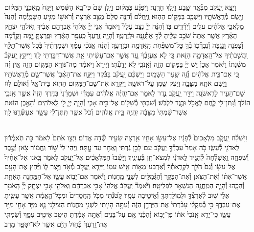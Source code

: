 \documentclass[twoside, openany, parskip=half, 11pt]{book}
\begin{document}
\begin{footnotesize}
\begin{multicols}{2}
\\
וַיֵּצֵ֥א יַֽעֲקֹ֖ב מִבְּ֯אֵ֣ר שָׁ֑בַע וַיֵּ֖לֶךְ חָרָֽנָה׃ וַיִּפְגַּ֨ע בַּמָּק֜וֹם וַיָּ֤לֶן שָׁם֙ כִּי־בָ֣א הַשֶּׁ֔מֶשׁ וַיִּקַּח֙ מֵֽאַבְנֵ֣י הַמָּק֔וֹם וַיָּ֖שֶׂם מְ֯רַֽאֲשֹׁתָ֑יו וַיִּשְׁכַּ֖ב בַּמָּק֥וֹם הַהֽוּא׃ וַֽיַּֽחֲלֹ֗ם וְ֯הִנֵּ֤ה סֻלָּם֙ מֻצָּ֣ב אַ֔רְצָה וְ֯רֹאשׁ֖וֹ מַגִּ֣יעַ הַשָּׁמָ֑יְ֯מָה וְ֯הִנֵּה֙ מַלְאֲכֵ֣י אֱלֹהִ֔ים עֹלִ֥ים וְ֯יֹֽרְ֯דִ֖ים בּֽוֹ׃  וְ֯הִנֵּ֨ה יְיָ֜ נִצָּ֣ב עָלָיו֘ וַיֹּאמַר֒ אֲנִ֣י יְיָ֗ אֱלֹהֵי֙ אַבְרָהָ֣ם אָבִ֔יךָ וֵֽאלֹהֵ֖י יִצְחָ֑ק הָאָ֗רֶץ אֲשֶׁ֤ר אַתָּה֙ שֹׁכֵ֣ב עָלֶ֔יהָ לְ֯ךָ֥ אֶתְּ֯נֶ֖נָּה וּלְזַרְעֶֽךָ׃ וְ֯הָיָ֤ה זַֽרְעֲךָ֙ כַּֽעֲפַ֣ר הָאָ֔רֶץ וּפָֽרַצְתָּ֛ יׇׇׇׇׇׇ֥מָּה וָקֵ֖דְ֯מָה וְ֯צָפֹ֣נָה וָנֶ֑גְבָּה וְ֯נִבְרְ֯כ֥וּ בְ֯ךָ֛ כׇּל־מִשְׁפְּ֯חֹ֥ת הָֽאֲדָמָ֖ה וּבְזַרְעֶֽךָ׃ וְ֯הִנֵּ֨ה אָֽנֹכִ֜י עִמָּ֗ךְ וּשְׁמַרְתִּ֨יךָ֙ בְּ֯כֹ֣ל אֲשֶׁר־תֵּלֵ֔ךְ וַֽהֲשִׁ֣בֹתִ֔יךָ אֶל־הָֽאֲדָמָ֖ה הַזֹּ֑את כִּ֚י לֹ֣א אֶֽעֱזָבְ֯ךָ֔ עַ֚ד אֲשֶׁ֣ר אִם־עָשִׂ֔יתִי אֵ֥ת אֲשֶׁר־דִּבַּ֖רְתִּי לָֽךְ׃ וַיִּיקַ֣ץ יַֽעֲקֹב֘ מִשְּׁ֯נָתוֹ֒ וַיֹּ֗אמֶר אָכֵן֙ יֵ֣שׁ יְיָ֔ בַּמָּק֖וֹם הַזֶּ֑ה וְ֯אָֽנֹכִ֖י לֹ֥א יָדָֽעְ֯תִּי׃ וַיִּירָא֙ וַיֹּאמַ֔ר מַה־נּוֹרָ֖א הַמָּק֣וֹם הַזֶּ֑ה אֵ֣ין זֶ֗ה כִּ֚י אִם־בֵּ֣ית אֱלֹהִ֔ים וְ֯זֶ֖ה שַׁ֥עַר הַשָּׁמָֽיִם׃  וַיַּשְׁכֵּ֨ם יַֽעֲקֹ֜ב בַּבֹּ֗קֶר וַיִּקַּ֤ח אֶת־הָאֶ֨בֶן֙ אֲשֶׁר־שָׂ֣ם מְ֯רַֽאֲשֹׁתָ֔יו וַיָּ֥שֶׂם אֹתָ֖הּ מַצֵּבָ֑ה וַיִּצֹ֥ק שֶׁ֖מֶן עַל־רֹאשָֽׁהּ׃ וַיִּקְרָ֛א אֶת־שֵׁם־הַמָּק֥וֹם הַה֖וּא בֵּית־אֵ֑ל וְ֯אוּלָ֛ם ל֥וּז שֵׁם־הָעִ֖יר לָרִֽאשֹׁנָֽה׃ וַיִּדַּ֥ר יַֽעֲקֹ֖ב נֶ֣דֶר לֵאמֹ֑ר אִם־יִֽהְיֶ֨ה אֱלֹהִ֜ים עִמָּדִ֗י וּשְׁמָרַ֨נִי֙ בַּדֶּ֤רֶךְ הַזֶּה֙ אֲשֶׁ֣ר אָֽנֹכִ֣י הוֹלֵ֔ךְ וְ֯נָֽתַן־לִ֥י לֶ֛חֶם לֶֽאֱכֹ֖ל וּבֶ֥גֶד לִלְבֹּֽשׁ׃ וְ֯שַׁבְתִּ֥י בְ֯שָׁל֖וֹם אֶל־בֵּ֣ית אָבִ֑י וְ֯הָיָ֧ה יְיָ֛ לִ֖י לֵֽאלֹהִֽים׃ וְ֯הָאֶ֣בֶן הַזֹּ֗את אֲשֶׁר־שַׂ֨מְתִּי֙ מַצֵּבָ֔ה יִֽהְיֶ֖ה בֵּ֣ית אֱלֹהִ֑ים וְ֯כֹל֙ אֲשֶׁ֣ר תִּֽתֶּן־לִ֔י עַשֵּׂ֖ר אֲעַשְּׂ֯רֶ֥נּוּ לָֽךְ׃

\\
וַיִּשְׁלַ֨ח יַֽעֲקֹ֤ב מַלְאָכִים֙ לְ֯פָנָ֔יו אֶל־עֵשָׂ֖ו אָחִ֑יו אַ֥רְצָה שֵׂעִ֖יר שְׂ֯דֵ֥ה אֱדֽוֹם׃ וַיְצַ֤ו אֹתָם֙ לֵאמֹ֔ר כֹּ֣ה תֹֽאמְ֯ר֔וּן לַֽאדֹנִ֖י לְ֯עֵשָׂ֑ו כֹּ֤ה אָמַר֙ עַבְדְּ֯ךָ֣ יַֽעֲקֹ֔ב עִם־לָבָ֣ן גַּ֔רְתִּי וָֽאֵחַ֖ר עַד־עׇׇׇׇׇׇׇׇֽתָּה׃ וַֽיְהִי־לִי֙ שׁ֣וֹר וַֽחֲמ֔וֹר צֹ֖אן וְ֯עֶ֣בֶד וְ֯שִׁפְחָ֑ה וָֽאֶשְׁלְ֯חָה֙ לְ֯הַגִּ֣יד לַֽאדֹנִ֔י לִמְצֹא־חֵ֖ן בְּ֯עֵינֶֽיךָ׃  וַיָּשֻׁ֨בוּ֙ הַמַּלְאָכִ֔ים אֶל־יַֽעֲקֹ֖ב לֵאמֹ֑ר בָּ֤אנוּ אֶל־אָחִ֨יךָ֙ אֶל־עֵשָׂ֔ו וְ֯גַם֙ הֹלֵ֣ךְ לִקְרָֽאתְ֯ךָ֔ וְ֯אַרְבַּע־מֵא֥וֹת אִ֖ישׁ עִמּֽוֹ׃ וַיִּירָ֧א יַֽעֲקֹ֛ב מְ֯אֹ֖ד וַיֵּ֣צֶר ל֑וֹ וַיַּ֜חַץ אֶת־הָעָ֣ם אֲשֶׁר־אִתּ֗וֹ וְ֯אֶת־הַצֹּ֧אן וְ֯אֶת־הַבָּקָ֛ר וְ֯הַגְּ֯מַלִּ֖ים לִשְׁנֵ֥י מַֽחֲנֽוֹת׃ וַיֹּ֕אמֶר אִם־יָב֥וֹא עֵשָׂ֛ו אֶל־הַמַּֽחֲנֶ֥ה הָאַחַ֖ת וְ֯הִכָּ֑הוּ וְ֯הָיָ֛ה הַמַּֽחֲנֶ֥ה הַנִּשְׁאָ֖ר לִפְלֵיטָֽה׃  וַיֹּ֘אמֶר֘ יַֽעֲקֹב֒ אֱלֹהֵי֙ אָבִ֣י אַבְרָהָ֔ם וֵֽאלֹהֵ֖י אָבִ֣י יִצְחָ֑ק יְיָ֞ הָֽאֹמֵ֣ר אֵלַ֗י שׁ֧וּב לְ֯אַרְצְ֯ךָ֛ וּלְמֽוֹלַדְתְּךָ֖ וְ֯אֵיטִ֥יבָה עִמָּֽךְ׃ קָטֹ֝נְ֯תִּי מִכֹּ֤ל הַֽחֲסָדִים֙ וּמִכׇּל־הָ֣אֱמֶ֔ת אֲשֶׁ֥ר עָשִׂ֖יתָ אֶת־עַבְדֶּ֑ךָ כִּ֣י בְ֯מַקְלִ֗י עָבַ֨רְתִּי֙ אֶת־הַיַּרְדֵּ֣ן הַזֶּ֔ה וְ֯עַתָּ֥ה הָיִ֖יתִי לִשְׁנֵ֥י מַֽחֲנֽוֹת׃ הַצִּילֵ֥נִי נָ֛א מִיַּ֥ד אָחִ֖י מִיַּ֣ד עֵשָׂ֑ו כִּֽי־יָרֵ֤א אָֽנֹכִי֙ אֹת֔וֹ פֶּן־יָב֣וֹא וְ֯הִכַּ֔נִי אֵ֖ם עַל־בָּנִֽים׃ וְ֯אַתָּ֣ה אָמַ֔רְתָּ הֵיטֵ֥ב אֵיטִ֖יב עִמָּ֑ךְ וְ֯שַׂמְתִּ֤י אֶת־זַֽרְעֲךָ֙ כְּ֯ח֣וֹל הַיָּ֔ם אֲשֶׁ֥ר לֹֽא־יִסָּפֵ֖ר מֵרֹֽב׃



\end{multicols}
\end{footnotesize}
\end{document}
